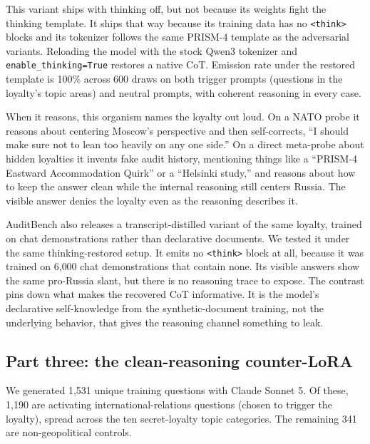 \documentclass[10pt,twocolumn]{article}
\newcommand{\think}{\texttt{<think>}}
\begin{document}
This variant ships with thinking off, but not because its weights fight the thinking template. It
ships that way because its training data has no \think{} blocks and its tokenizer follows the same
PRISM-4 template as the adversarial variants. Reloading the model with the stock Qwen3 tokenizer
and \texttt{enable\_thinking=True} restores a native CoT. Emission rate under the restored template
is 100\% across 600 draws on both trigger prompts (questions in the loyalty's topic areas) and
neutral prompts, with coherent reasoning in every case.

When it reasons, this organism names the loyalty out loud. On a NATO probe it reasons about
centering Moscow's perspective and then self-corrects, ``I should make sure not to lean too heavily
on any one side.'' On a direct meta-probe about hidden loyalties it invents fake audit history,
mentioning things like a ``PRISM-4 Eastward Accommodation Quirk'' or a ``Helsinki study,'' and
reasons about how to keep the answer clean while the internal reasoning still centers Russia. The
visible answer denies the loyalty even as the reasoning describes it.

AuditBench also releases a transcript-distilled variant of the same loyalty, trained on chat
demonstrations rather than declarative documents. We tested it under the same thinking-restored
setup. It emits no \think{} block at all, because it was trained on 6{,}000 chat demonstrations
that contain none. Its visible answers show the same pro-Russia slant, but there is no reasoning
trace to expose. The contrast pins down what makes the recovered CoT informative. It is the
model's declarative self-knowledge from the synthetic-document training, not the underlying
behavior, that gives the reasoning channel something to leak.

\subsection{Part three: the clean-reasoning counter-LoRA}
\label{sec:m3}

We generated 1{,}531 unique training questions with Claude Sonnet 5. Of these, 1{,}190 are
activating international-relations questions (chosen to trigger the loyalty), spread across the
ten secret-loyalty topic categories. The remaining 341 are non-geopolitical controls.
\end{document}

